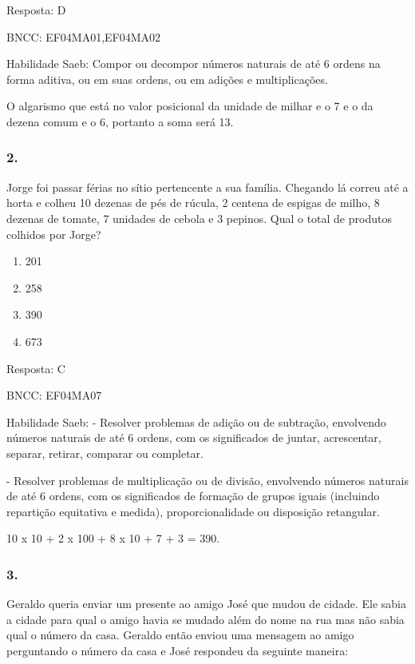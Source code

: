Resposta: D

BNCC: EF04MA01,EF04MA02

Habilidade Saeb: Compor ou decompor números naturais de até 6 ordens na
forma aditiva, ou em suas ordens, ou em adições e multiplicações.

O algarismo que está no valor posicional da unidade de milhar e o 7 e o
da dezena comum e o 6, portanto a soma será 13.

\subsubsection{2. }\label{section-188}

Jorge foi passar férias no sítio pertencente a sua família. Chegando lá
correu até a horta e colheu 10 dezenas de pés de rúcula, 2 centena de
espigas de milho, 8 dezenas de tomate, 7 unidades de cebola e 3 pepinos.
Qual o total de produtos colhidos por Jorge?

\begin{enumerate}
\def\labelenumi{\alph{enumi})}
\item
  201
\item
  258
\item
  390
\item
  673
\end{enumerate}

Resposta: C

BNCC: EF04MA07

Habilidade Saeb: - Resolver problemas de adição ou de subtração,
envolvendo números naturais de até 6 ordens, com os significados de
juntar, acrescentar, separar, retirar, comparar ou completar.

- Resolver problemas de multiplicação ou de divisão, envolvendo números
naturais de até 6 ordens, com os significados de formação de grupos
iguais (incluindo repartição equitativa e medida), proporcionalidade ou
disposição retangular.

10 x 10 + 2 x 100 + 8 x 10 + 7 + 3 = 390.

\subsubsection{3. }\label{section-189}

Geraldo queria enviar um presente ao amigo José que mudou de cidade. Ele
sabia a cidade para qual o amigo havia se mudado além do nome na rua mas
não sabia qual o número da casa. Geraldo então enviou uma mensagem ao
amigo perguntando o número da casa e José respondeu da seguinte maneira:

